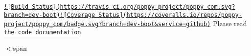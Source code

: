 \href{https://travis-ci.org/poppy-project/poppy_com}{\tt !\mbox{[}Build Status\mbox{]}(https\-://travis-\/ci.\-org/poppy-\/project/poppy\-\_\-com.\-svg?branch=dev-\/boot)}\href{https://coveralls.io/github/poppy-project/poppy_com?branch=dev-boot}{\tt !\mbox{[}Coverage Status\mbox{]}(https\-://coveralls.\-io/repos/poppy-\/project/poppy\-\_\-com/badge.\-svg?branch=dev-\/boot\&service=github)} Please read \href{http://poppy-project.github.io/poppy_com/}{\tt the code documentation}

$<$span 